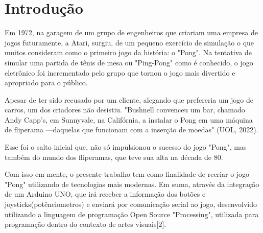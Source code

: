 \section{Introdução}

Em 1972, na garagem de um grupo de engenheiros que criariam uma empresa de jogos futuramente, a Atari, surgiu, de um pequeno exercício de simulação o que muitos consideram como o primeiro jogo da história: o "Pong". Na tentativa de simular uma partida de tênis de mesa ou "Ping-Pong" como é conhecido, o jogo eletrônico foi incrementado pelo grupo que tornou o jogo mais divertido e apropriado para o público.

	Apesar de ter sido recusado por um cliente, alegando que prefereria um jogo de carros, um dos criadores não desistiu. "Bushnell convenceu um bar, chamado Andy Capp's, em Sunnyvale, na Califórnia, a instalar o Pong em uma máquina de fliperama —daquelas que funcionam com a inserção de moedas" (UOL, 2022). 

	Esse foi o salto inicial que, não só impulsionou o sucesso do jogo "Pong", mas também do mundo dos fliperamas, que teve sua alta na década de 80.

	Com isso em mente, o presente trabalho tem como finalidade de recriar o jogo "Pong" utilizando de tecnologias mais modernas. Em suma, através da integração de um Arduino UNO, que irá receber a informação dos botões e joysticks(potênciometros) e enviará por comunicação serial ao jogo, desenvolvido utilizando a linguagem de programação Open Source "Processing", utilizada para programação dentro do contexto de artes visuais[2].

